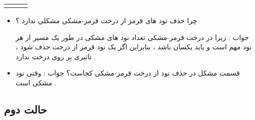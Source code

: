 \documentclass[12pt]{article}
\begin{document}
\begin{latin}
\begin{center}
  \bgroup
  \def\arraystretch{1.5}%
  \begin{tabular}{ C D C }
    &
    &
     \\ 
  \end{tabular}
  \egroup
\end{center}
\end{latin}





\begin{tcolorbox}
\begin{itemize}
	\item چرا حذف نود های قرمز از درخت قرمز-مشکی مشکلی ندارد ؟
	
	\noindent
	جواب : 
	زیرا در درخت قرمز-مشکی تعداد نود های مشکی در طور یک مسیر از هر نود مهم است و باید یکسان باشد ، بنابراین اگر یک نود قرمز از درخت حذف شود ، تاثیری بر روی درخت ندارد .
\end{itemize}
\end{tcolorbox}




\begin{tcolorbox}
\begin{itemize}
	\item قسمت مشکل در حذف نود از درخت قرمز-مشکی کجاست؟
	\noindent
	جواب : وقتی نود مشکی است .
\end{itemize}
\end{tcolorbox}





\subsection{حالت دوم}
\end{document}
